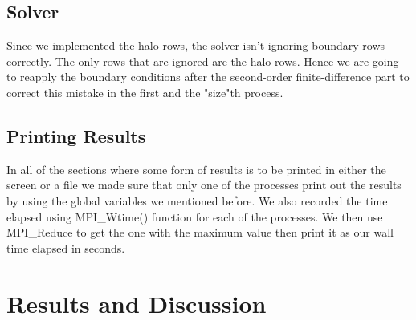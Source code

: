 \documentclass{report}
\begin{document}
\section{Solver}
Since we implemented the halo rows, the solver isn't ignoring boundary rows correctly. The only rows that are ignored are the halo rows. Hence we are going to reapply the boundary conditions after the second-order finite-difference part to correct this mistake in the first and the "size"th process. 

\section{Printing Results}
In all of the sections where some form of results is to be printed in either the screen or a file we made sure that only one of the processes print out the results by using the global variables we mentioned before.
We also recorded the time elapsed using MPI\_Wtime() function for each of the processes. We then use MPI\_Reduce to get the one with the maximum value then print it as our wall time elapsed in seconds.

\chapter{Results and Discussion}
\end{document}
